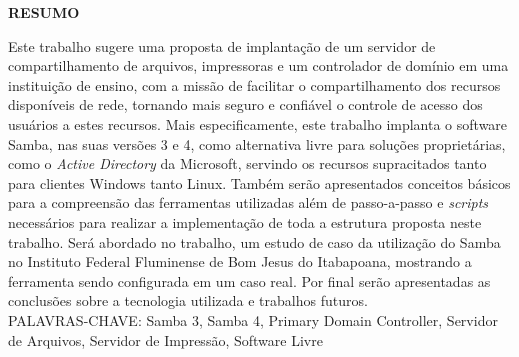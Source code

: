 \begin{center}
\textbf{RESUMO}
\end{center}
\singlespacing

\noindent Este trabalho sugere uma proposta de implantação de um servidor de compartilhamento de arquivos, impressoras e um controlador de domínio em uma instituição de ensino, com a missão de facilitar o compartilhamento dos recursos disponíveis de rede, tornando mais seguro e confiável o controle de acesso dos usuários a estes recursos. Mais especificamente, este trabalho implanta o software Samba, nas suas versões 3 e 4, como alternativa livre para soluções proprietárias, como o \textit{Active Directory} da Microsoft, servindo os recursos supracitados tanto para clientes Windows tanto Linux. Também serão apresentados conceitos básicos para a compreensão das ferramentas utilizadas além de passo-a-passo e \textit{scripts} necessários para realizar a implementação de toda a estrutura proposta neste trabalho. Será abordado no trabalho, um estudo de caso da utilização do Samba no Instituto Federal Fluminense de Bom Jesus do Itabapoana, mostrando a ferramenta sendo configurada em um caso real. Por final serão apresentadas as conclusões sobre a tecnologia utilizada e trabalhos futuros.\\

\noindent PALAVRAS-CHAVE: Samba 3, Samba 4, Primary Domain Controller, Servidor de Arquivos, Servidor de Impressão, Software Livre
